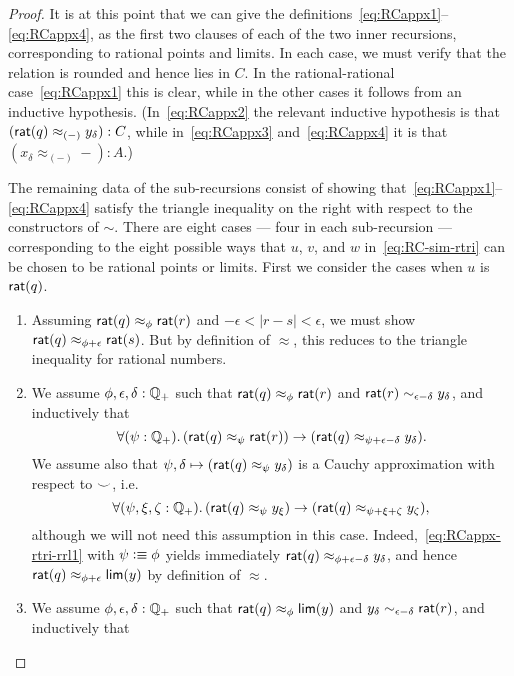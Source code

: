 \begin{proof}
  It is at this point that we can give the definitions~\eqref{eq:RCappx1}--\eqref{eq:RCappx4}, as the first two clauses of each of the two inner recursions, corresponding to rational points and limits.
  In each case, we must verify that the relation is rounded and hence lies in $C$.
  In the rational-rational case~\eqref{eq:RCappx1} this is clear, while in the other cases it follows from an inductive hypothesis.
  (In~\eqref{eq:RCappx2} the relevant inductive hypothesis is that $(\mathsf{rat}(q) \approx_{(-)} y_\delta) : C$, while in~\eqref{eq:RCappx3} and~\eqref{eq:RCappx4} it is that $(x_\delta \approx_{(-)} -) : A$.)

  The remaining data of the sub-recursions consist of showing that~\eqref{eq:RCappx1}--\eqref{eq:RCappx4} satisfy the triangle inequality on the right with respect to the constructors of $\sim$.
  There are eight cases --- four in each sub-recursion --- corresponding to the eight possible ways that $u$, $v$, and $w$ in~\eqref{eq:RC-sim-rtri} can be chosen to be rational points or limits.
  First we consider the cases when $u$ is $\mathsf{rat}(q)$.
  \begin{enumerate}
  \item Assuming $\mathsf{rat}(q)\approx_\phi \mathsf{rat}(r)$ and $-\epsilon<|r-s|<\epsilon$, we must show $\mathsf{rat}(q)\approx_{\phi+\epsilon} \mathsf{rat}(s)$.
    But by definition of $\approx$, this reduces to the triangle inequality for rational numbers.
  \item We assume $\phi,\epsilon,\delta:\mathbb{Q}_{+}$ such that $\mathsf{rat}(q)\approx_\phi \mathsf{rat}(r)$ and $\mathsf{rat}(r) \sim_{\epsilon-\delta} y_\delta$, and inductively that
    \begin{equation}
      \fall{\psi:\Qp}(\rcrat(q) \approx_{\psi} \rcrat(r)) \to (\rcrat(q) \approx_{\psi+\epsilon-\delta} y_\delta).\label{eq:RCappx-rtri-rrl1}
    \end{equation}
    We assume also that $\psi,\delta\mapsto (\mathsf{rat}(q) \approx_{\psi} y_\delta)$ is a Cauchy approximation with respect to $\smile$, i.e.\
    \begin{equation}
      \fall{\psi,\xi,\zeta:\Qp} (\rcrat(q) \approx_{\psi} y_\xi) \to (\rcrat(q) \approx_{\psi+\xi+\zeta} y_\zeta),\label{eq:RCappx-rtri-rrl2}
    \end{equation}
    although we will not need this assumption in this case.
    Indeed,~\eqref{eq:RCappx-rtri-rrl1} with $\psi\vcentcolon\equiv \phi$ yields immediately $\mathsf{rat}(q) \approx_{\phi+\epsilon-\delta} y_\delta$, and hence $\mathsf{rat}(q) \approx_{\phi+\epsilon} \mathsf{lim}(y)$ by definition of $\approx$.
  \item We assume $\phi,\epsilon,\delta:\mathbb{Q}_{+}$ such that $\mathsf{rat}(q)\approx_\phi \mathsf{lim}(y)$ and $y_\delta \sim_{\epsilon-\delta} \mathsf{rat}(r)$, and inductively that

\end{enumerate}
\end{proof}
